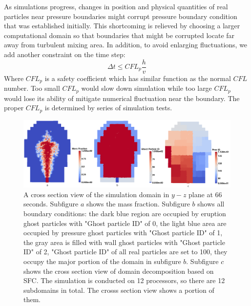\documentclass[journal abbreviation, manuscript]{copernicus}
\begin{document}
As simulations progress, changes in position and physical quantities of real particles near pressure boundaries might corrupt pressure boundary condition that was established initially. This shortcoming is relieved by choosing a larger computational domain so that boundaries that might be corrupted locate far away from turbulent mixing area. In addition, to avoid enlarging fluctuations, we add another constraint on the time step: 
\begin{equation}
\Delta t \leq CFL_p \dfrac{h}{v}
\end{equation}
Where $CFL_p$ is a safety coefficient which has similar function as the normal $CFL$ number. Too small $CFL_p$ would slow down simulation while too large $CFL_p$ would lose its ability of mitigate numerical fluctuation near the boundary. The proper $CFL_p$ is determined by series of simulation tests.

\begin{figure}
\includegraphics[width=18cm]{t120_bc_proc}
\caption{A cross section view of the simulation domain in $y-z$ plane at 66 seconds. Subfigure $a$ shows the mass fraction. Subfigure $b$ shows all boundary conditions: the dark blue region are occupied by eruption ghost particles with "Ghost particle ID" of 0, the light blue area are occupied by pressure ghost particles with "Ghost particle ID" of 1, the gray area is filled with wall ghost particles with "Ghost particle ID" of 2, "Ghost particle ID" of all real particles are set to 100, they occupy the major portion of the domain in subfigure $b$. Subfigure $c$ shows the cross section view of domain decomposition based on SFC. The simulation is conducted on 12 processors, so there are 12 subdomains in total. The crosss section view shows a portion of them.}
\label{fig:bc_and_domain_decomp}
\end{figure}
\end{document}
